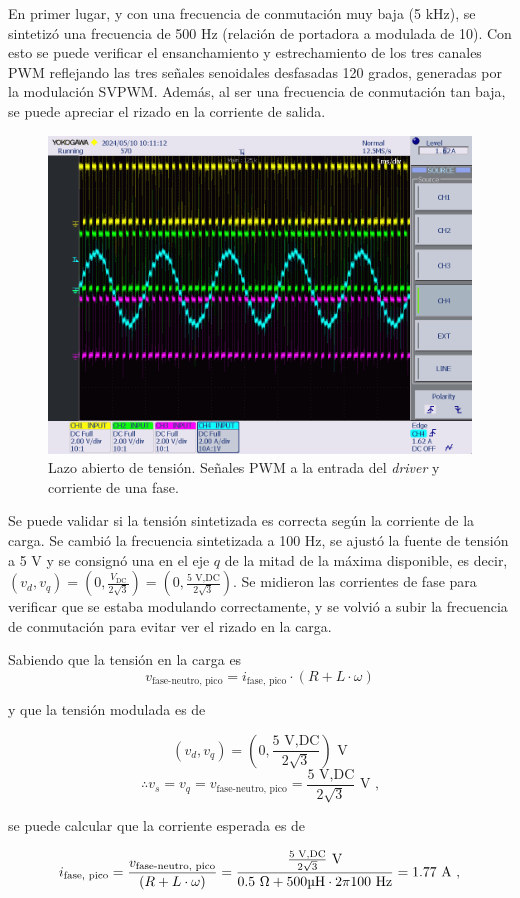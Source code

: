En primer lugar, y con una frecuencia de conmutación muy baja (5 kHz), se sintetizó una frecuencia de 500 Hz (relación de portadora a modulada de 10). Con esto se puede verificar el ensanchamiento y estrechamiento de los tres canales PWM reflejando las tres señales senoidales desfasadas 120 grados, generadas por la modulación SVPWM. Además, al ser una frecuencia de conmutación tan baja, se puede apreciar el rizado en la corriente de salida.

\begin{figure}[H]
	\centering
	\includegraphics[width=0.7\linewidth]{fig/3RL-PWM}
	\caption{Lazo abierto de tensión. Señales PWM a la entrada del \textit{driver} y corriente de una fase.}
\end{figure}

Se puede validar si la tensión sintetizada es correcta según la corriente de la carga. Se cambió la frecuencia sintetizada a 100 Hz, se ajustó la fuente de tensión a 5 V y se consignó una en el eje $q$ de la mitad de la máxima disponible, es decir, $(v_d, v_q) = (0, \frac{V_{\text{DC}}}{2\sqrt{3}}) = (0, \frac{5 \text{ V,DC}}{2\sqrt{3}})$. Se midieron las corrientes de fase para verificar que se estaba modulando correctamente, y se volvió a subir la frecuencia de conmutación para evitar ver el rizado en la carga.

Sabiendo que la tensión en la carga es
\[
v_{\text{fase-neutro, pico}} = i_{\text{fase, pico}}\cdot (R + L\cdot\omega)
\]

y que la tensión modulada es de 

\[ (v_d, v_q) = (0, \frac{5 \text{ V,DC}}{2\sqrt{3}}) \text{ V}\]
\[ \therefore v_s = v_q = v_{\text{fase-neutro, pico}} = \frac{5 \text{ V,DC}}{2\sqrt{3}} \text{ V ,}\]

se puede calcular que la corriente esperada es de

\[
i_{\text{fase, pico}} = \frac{v_{\text{fase-neutro, pico}}}{(R + L\cdot\omega)} = \frac{\frac{5 \text{ V,DC}}{2\sqrt{3}} \text{ V}}{0.5 \text{ }\Omega + 500 \text{\unit{\micro\henry}} \cdot 2\pi100 \text{ Hz}} = 1.77 \text{ A ,}
\]

